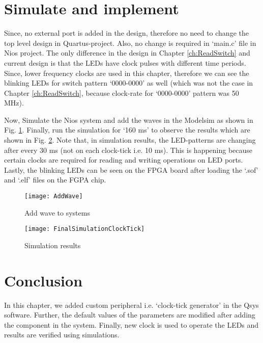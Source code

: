 \section{Simulate and implement}
Since, no external port is added in the design, therefore no need to change the top level design in Quartus-project. Also, no change is required in `main.c' file in Nios project. The only difference in the design in Chapter \ref{ch:ReadSwitch} and current design is that the LEDs have clock pulses with different time periods. Since, lower frequency clocks are used in this chapter, therefore we can see the blinking LEDs for switch pattern `0000-0000' as well (which was not the case in Chapter \ref{ch:ReadSwitch}, because clock-rate for `0000-0000' pattern was 50 MHz).

Now, Simulate the Nios system and add the waves in the Modelsim as shown in Fig. \ref {fig:AddWave}. Finally, run the simulation for `160 ms' to observe the results which are shown in Fig. \ref{fig:FinalSimulationClockTick}. Note that, in simulation results, the LED-patterns are changing after every 30 ms (not on each clock-tick i.e. 10 ms). This is happening because certain clocks are required for reading and writing operations on LED ports. Lastly, the blinking LEDs can be seen on the FPGA board after loading the `.sof' and `.elf' files on the FGPA chip. 

\begin{figure}[!h]
	\centering
	\texttt{[image: AddWave]}
	\caption{Add wave to systems}
	\label{fig:AddWave}
\end{figure}

\begin{figure}[!h]
	\centering
	\texttt{[image: FinalSimulationClockTick]}
	\caption{Simulation results}
	\label{fig:FinalSimulationClockTick}
\end{figure}

\section{Conclusion}
In this chapter, we added custom peripheral i.e. `clock-tick generator' in the Qsys software. Further, the default values of the parameters are modified after adding the component in the system. Finally, new clock is used to operate the LEDs and results are verified using simulations.  